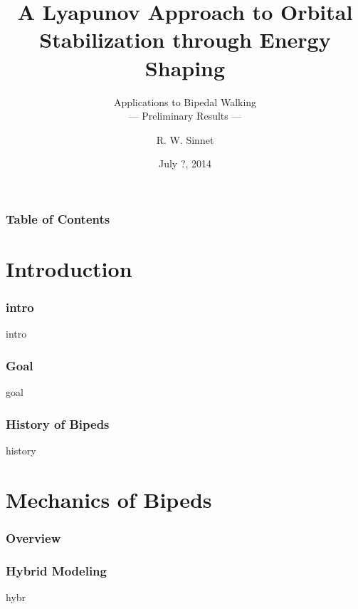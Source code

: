 \documentclass{beamer}
\title[Energy Shaping]{A Lyapunov Approach to Orbital \\Stabilization through Energy Shaping}
\subtitle{Applications to Bipedal Walking\\--- Preliminary Results ---}
\author{R. W. Sinnet}
\institute{Department of Mechanical Engineering\\ Texas A\&M University}
\date{July ?, 2014}
\begin{document}
\frame{\titlepage}

\begin{frame}
  \frametitle{Table of Contents}
  \tableofcontents
\end{frame}

\section{Introduction}
\begin{frame}
  \frametitle{intro}
  intro
\end{frame}

\begin{frame}
  \frametitle{Goal}
  goal
\end{frame}

\begin{frame}
  \frametitle{History of Bipeds}
  history
\end{frame}

\section{Mechanics of Bipeds}
\begin{frame}
  \frametitle{Overview}
  \tableofcontents[sectionstyle=show/shaded,subsectionstyle=hide]
\end{frame}

\begin{frame}
  \frametitle{Hybrid Modeling}
  hybr
\end{frame}
\end{document}
